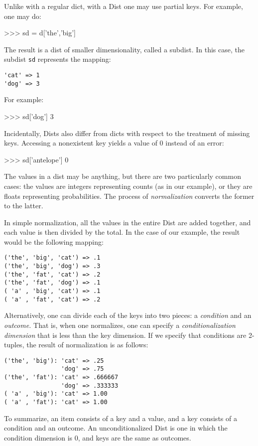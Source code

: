 Unlike with a regular dict, with a Dist one may use partial keys.
For example, one may do:
\begin{python}
>>> sd = d['the','big']
\end{python}
The result is a dist of smaller dimensionality, called a subdist.
In this case, the subdist {\tt sd} represents the mapping:
\begin{verbatim}
'cat' => 1
'dog' => 3
\end{verbatim}
For example:
\begin{python}
>>> sd['dog']
3
\end{python}
Incidentally, Dists also differ from dicts with respect to the
treatment of missing keys.  Accessing a nonexistent key yields a value
of 0 instead of an error:
\begin{python}
>>> sd['antelope']
0
\end{python}

The values in a dist may be anything, but there are two particularly
common cases: the values are integers representing counts (as in our
example), or they are floats representing probabilities.  The process
of {\it normalization\/} converts the former to the latter.

In simple normalization, all the values in the entire Dist are added
together, and each value is then divided by the total.  In the case of
our example, the result would be the following mapping:
\begin{verbatim}
('the', 'big', 'cat') => .1
('the', 'big', 'dog') => .3
('the', 'fat', 'cat') => .2
('the', 'fat', 'dog') => .1
( 'a' , 'big', 'cat') => .1
( 'a' , 'fat', 'cat') => .2
\end{verbatim}

Alternatively, one can divide each of the keys into two pieces: a
{\it condition\/} and an {\it outcome.\/}  That is, when one
normalizes, one can specify a {\it conditionalization dimension\/}
that is less than the key dimension.  If we specify that conditions
are 2-tuples, the result of normalization is as follows:
\begin{verbatim}
('the', 'big'): 'cat' => .25
                'dog' => .75
('the', 'fat'): 'cat' => .666667
                'dog' => .333333
( 'a' , 'big'): 'cat' => 1.00
( 'a' , 'fat'): 'cat' => 1.00
\end{verbatim}

To summarize, an item consists of a key and a value, and a key
consists of a condition and an outcome.  An unconditionalized Dist is
one in which the condition dimension is 0, and keys are the same as
outcomes.


